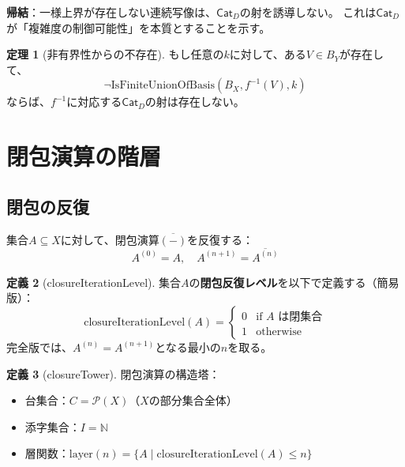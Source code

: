 \documentclass[a4paper,12pt]{ltjsarticle}
\theoremstyle{definition}
\newtheorem{definition}{定義}[section]
\newtheorem{theorem}[definition]{定理}
\newcommand{\N}{\mathbb{N}}
\newcommand{\catD}{\mathsf{Cat}_D}
\begin{document}
\begin{keybox}[title=射の存在と一様上界の同値性]
\begin{center}
\end{center}
\textbf{帰結}：一様上界が存在しない連続写像は、$\catD$の射を誘導しない。
これは$\catD$が「複雑度の制御可能性」を本質とすることを示す。
\end{keybox}

\begin{theorem}[非有界性からの不存在]\label{thm:unbounded}
もし任意の$k$に対して、ある$V \in B_Y$が存在して、
\[
\neg \mathrm{IsFiniteUnionOfBasis}(B_X, f^{-1}(V), k)
\]
ならば、$f^{-1}$に対応する$\catD$の射は存在しない。
\end{theorem}

\section{閉包演算の階層}

\subsection{閉包の反復}

集合$A \subseteq X$に対して、閉包演算$\overline{(-)}$を反復する：
\[
A^{(0)} = A, \quad A^{(n+1)} = \overline{A^{(n)}}
\]

\begin{definition}[closureIterationLevel]
集合$A$の\textbf{閉包反復レベル}を以下で定義する（簡易版）：
\[
\mathrm{closureIterationLevel}(A) =
\begin{cases}
  0 & \text{if } A \text{ は閉集合} \\
  1 & \text{otherwise}
\end{cases}
\]
完全版では、$A^{(n)} = A^{(n+1)}$となる最小の$n$を取る。
\end{definition}

\begin{definition}[closureTower]
閉包演算の構造塔：
\begin{itemize}
  \item 台集合：$C = \mathcal{P}(X)$（$X$の部分集合全体）
  \item 添字集合：$I = \N$
  \item 層関数：$\mathrm{layer}(n) = \{A \mid \mathrm{closureIterationLevel}(A) \leq n\}$
\end{itemize}
\end{definition}
\end{document}
